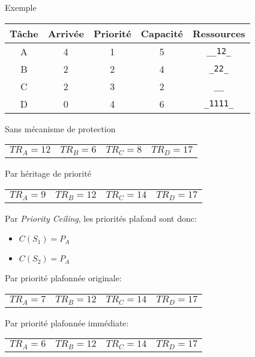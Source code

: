 \begin{frame}{Exemple}
  \begin{center}
    \begin{tabular}{ccccc}
      \hline
      Tâche & Arrivée & Priorité & Capacité & Ressources \\
      \hline
      A & 4 & 1 & 5 & \texttt{\_\_12\_}\\
      B & 2 & 2 & 4 & \texttt{\_22\_}\\
      C & 2 & 3 & 2 & \texttt{\_\_}\\
      D & 0 & 4 & 6 & \texttt{\_1111\_}\\
      \hline
    \end{tabular}
  \end{center}
  \begin{overprint}

    Sans mécanisme de protection
    \begin{center}
      
      \begin{tabular}{cccc}
        $TR_A = 12$ & $TR_B = 6$ & $TR_C = 8$ & $TR_D = 17$\\
      \end{tabular}
    \end{center}

    Par héritage de priorité
    \begin{center}
      
      \begin{tabular}{cccc}
        $TR_A = 9$ & $TR_B = 12$ & $TR_C = 14$ & $TR_D = 17$\\
      \end{tabular}
    \end{center}

    Par \emph{Priority Ceiling}, les priorités plafond sont donc:
    \begin{itemize}
    \item $C(S_1) = P_A$
    \item $C(S_2) = P_A$
    \end{itemize}

    Par priorité plafonnée originale:
    \begin{center}
      
      \begin{tabular}{cccc}
        $TR_A = 7$ & $TR_B = 12$ & $TR_C = 14$ & $TR_D = 17$\\
      \end{tabular}
    \end{center}

    Par priorité plafonnée immédiate:
    \begin{center}
      
      \begin{tabular}{cccc}
        $TR_A = 6$ & $TR_B = 12$ & $TR_C = 14$ & $TR_D = 17$\\
      \end{tabular}
    \end{center}
  \end{overprint}
\end{frame}

